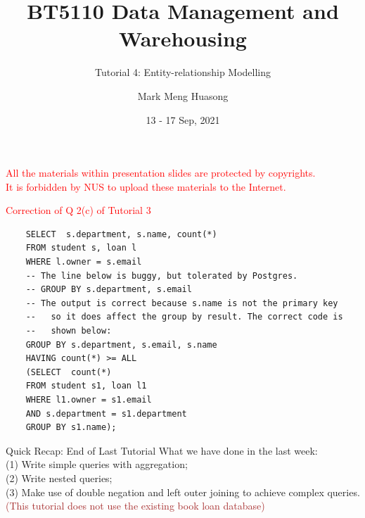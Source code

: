 \title{BT5110 Data Management and Warehousing}

\subtitle{Tutorial 4: Entity-relationship Modelling}

\author{Mark Meng Huasong}



\date{13 - 17 Sep, 2021}

\begin{frame}
	\titlepage
	\begin{tcolorbox}
		\begin{center}
			{\scriptsize \textcolor{red}{All the materials within presentation slides are protected by copyrights.\\
					It is forbidden by NUS to upload these materials to the Internet.}}
		\end{center}
	\end{tcolorbox}
\end{frame}

\begin{frame}[fragile]{\textcolor{red}{Correction of Q 2(c) of Tutorial 3}}
\begin{lstlisting}
	SELECT  s.department, s.name, count(*)
	FROM student s, loan l
	WHERE l.owner = s.email
	-- The line below is buggy, but tolerated by Postgres. 
	-- GROUP BY s.department, s.email
	-- The output is correct because s.name is not the primary key 
	--   so it does affect the group by result. The correct code is
	--   shown below:
	GROUP BY s.department, s.email, s.name
	HAVING count(*) >= ALL
	(SELECT  count(*) 
	FROM student s1, loan l1
	WHERE l1.owner = s1.email
	AND s.department = s1.department
	GROUP BY s1.name);
\end{lstlisting}\vspace{5pt}
\end{frame}

\begin{frame}[fragile]{Quick Recap: End of Last Tutorial}
	What we have done in the last week:\\\vspace{5pt}
	(1) Write simple queries with aggregation;\\
	(2) Write nested queries;\\
	(3) Make use of double negation and left outer joining to achieve complex queries. \\\vspace{5pt}
	\textcolor{brown}{(This tutorial does not use the existing book loan database)}
\end{frame}


